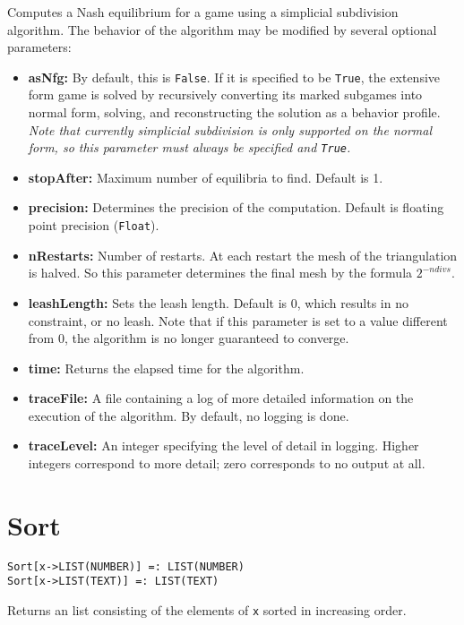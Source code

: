 \noindent
Computes a Nash equilibrium for a game using a simplicial subdivision
algorithm. The behavior of the algorithm may be modified by several optional
parameters:
\begin{itemize}
\item
\textbf{asNfg:} By default, this is \verb+False+.  If it is specified to be
\verb+True+, the extensive form game is solved by recursively converting
its marked subgames into normal form, solving, and reconstructing the
solution as a behavior profile.  {\it Note that currently simplicial
subdivision is only supported on the normal form, so this parameter
must always be specified and {\tt True}.}
\item
\textbf{stopAfter:} Maximum number of equilibria to find. Default is 1.  
\item
\textbf{precision:} Determines the precision of the computation. Default is
floating point precision (\texttt{Float}). 
\item 
\textbf{nRestarts:} Number of restarts.  At each restart the mesh of the
triangulation is halved.  So this parameter determines the final mesh
by the formula $2^{-ndivs}$.
\item
\textbf{leashLength:} Sets the leash length. Default is 0, which results in no
constraint, or no leash.  Note that if this parameter is set to a value
different from 0, the algorithm is no longer guaranteed to converge.
\item
\textbf{time:} Returns the elapsed time for the algorithm.
\item
\textbf{traceFile:} A file containing a log of more detailed information on the
execution of the algorithm.  By default, no logging is done.
\item
\textbf{traceLevel:} An integer specifying the level of detail in logging.
Higher integers correspond to more detail; zero corresponds to
no output at all.
\end{itemize}


\section*{Sort}\label{PrimSort}
\begin{verbatim}
Sort[x->LIST(NUMBER)] =: LIST(NUMBER)
Sort[x->LIST(TEXT)] =: LIST(TEXT)
\end{verbatim}

\noindent
Returns an list consisting of the elements of \verb+x+ sorted in
increasing order.

